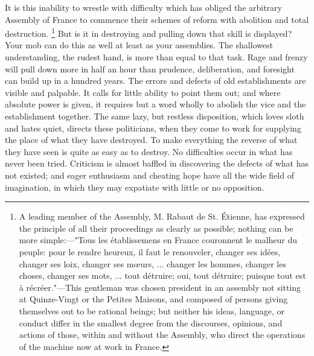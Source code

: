 It is this inability to wrestle with difficulty which has obliged the arbitrary Assembly of France to commence their schemes of reform with abolition and total destruction.
\footnote{ A leading member of the Assembly, M. Rabaut de St. Étienne, has expressed the principle of all their proceedings as clearly as possible; nothing can be more simple:—"Tous les établissemens en France couronnent le malheur du peuple: pour le rendre heureux, il faut le renouveler, changer ses idées, changer ses loix, changer ses mœurs, ... changer les hommes, changer les choses, changer ses mots, ... tout détruire; oui, tout détruire; puisque tout est à récréer."—This gentleman was chosen president in an assembly not sitting at Quinze-Vingt or the Petites Maisons, and composed of persons giving themselves out to be rational beings; but neither his ideas, language, or conduct differ in the smallest degree from the discourses, opinions, and actions of those, within and without the Assembly, who direct the operations of the machine now at work in France.}
 But is it in destroying and pulling down that skill is displayed? Your mob can do this as well at least as your assemblies. The shallowest understanding, the rudest hand, is more than equal to that task. Rage and frenzy will pull down more in half an hour than prudence, deliberation, and foresight can build up in a hundred years. The errors and defects of old establishments are visible and palpable. It calls for little ability to point them out; and where absolute power is given, it requires but a word wholly to abolish the vice and the establishment together. The same lazy, but restless disposition, which loves sloth and hates quiet, directs these politicians, when they come to work for supplying the place of what they have destroyed. To make everything the reverse of what they have seen is quite as easy as to destroy. No difficulties occur in what has never been tried. Criticism is almost baffled in discovering the defects of what has not existed; and eager enthusiasm and cheating hope have all the wide field of imagination, in which they may expatiate with little or no opposition.

